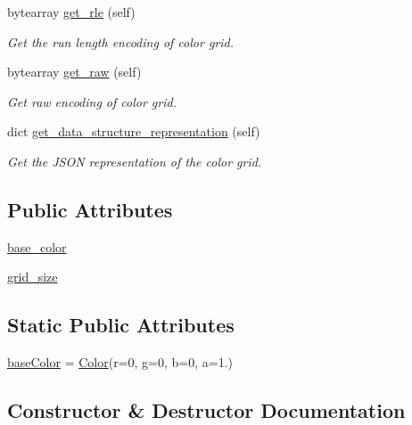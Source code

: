 \begin{DoxyCompactItemize}
bytearray \mbox{\hyperlink{classbridges_1_1color__grid_1_1_color_grid_a1a8e0a96bb381a7359aff7cff05b0d16}{get\+\_\+rle}} (self)
\begin{DoxyCompactList}\small\item\em Get the run length encoding of color grid. \end{DoxyCompactList}\item 
bytearray \mbox{\hyperlink{classbridges_1_1color__grid_1_1_color_grid_aae710dfd1c06f37a98437a6b4fb813bf}{get\+\_\+raw}} (self)
\begin{DoxyCompactList}\small\item\em Get raw encoding of color grid. \end{DoxyCompactList}\item 
dict \mbox{\hyperlink{classbridges_1_1color__grid_1_1_color_grid_ab90bbb0fad3d759639171dcd9099914e}{get\+\_\+data\+\_\+structure\+\_\+representation}} (self)
\begin{DoxyCompactList}\small\item\em Get the J\+S\+ON representation of the color grid. \end{DoxyCompactList}\end{DoxyCompactItemize}
\subsection*{Public Attributes}
\begin{DoxyCompactItemize}
\item 
\mbox{\hyperlink{classbridges_1_1color__grid_1_1_color_grid_af7c28369f01fb4dfc82a5824583a6dbf}{base\+\_\+color}}
\item 
\mbox{\hyperlink{classbridges_1_1color__grid_1_1_color_grid_af248634de8b3d7b92feef01eed40821b}{grid\+\_\+size}}
\end{DoxyCompactItemize}
\subsection*{Static Public Attributes}
\begin{DoxyCompactItemize}
\item 
\mbox{\hyperlink{classbridges_1_1color__grid_1_1_color_grid_ad2db62703be80114e46b490ff02f8bd9}{base\+Color}} = \mbox{\hyperlink{classbridges_1_1color_1_1_color}{Color}}(r=0, g=0, b=0, a=1.)
\end{DoxyCompactItemize}


\subsection{Constructor \& Destructor Documentation}
\mbox{\label{classbridges_1_1color__grid_1_1_color_grid_a0dfc6a57286fca719146b68595cbff51}} 

